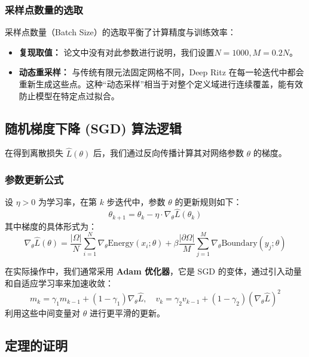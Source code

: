 	\subsubsection{采样点数量的选取}
	采样点数量（Batch Size）的选取平衡了计算精度与训练效率：
	\begin{itemize}
		\item \textbf{复现取值：} 论文中没有对此参数进行说明，我们设置$N = 1000, M = 0.2N$。
		\item \textbf{动态重采样：} 与传统有限元法固定网格不同，Deep Ritz 在每一轮迭代中都会重新生成这些点。这种“动态采样”相当于对整个定义域进行连续覆盖，能有效防止模型在特定点过拟合。
	\end{itemize}
	
	\subsection{随机梯度下降 (SGD) 算法逻辑}
	
	在得到离散损失 $\hat{L}(\theta)$ 后，我们通过反向传播计算其对网络参数 $\theta$ 的梯度。
	
	\subsubsection{参数更新公式}
	设 $\eta > 0$ 为学习率，在第 $k$ 步迭代中，参数 $\theta$ 的更新规则如下：
	\begin{equation}
		\theta_{k+1} = \theta_{k} - \eta \cdot \nabla_\theta \hat{L}(\theta_k)
	\end{equation}
	其中梯度的具体形式为：
	\begin{equation}
		\nabla_\theta \hat{L}(\theta) = \frac{|\Omega|}{N} \sum_{i=1}^N \nabla_\theta \text{Energy}(x_i; \theta) + \beta \frac{|\partial\Omega|}{M} \sum_{j=1}^M \nabla_\theta \text{Boundary}(y_j; \theta)
	\end{equation}
	
	在实际操作中，我们通常采用 \textbf{Adam 优化器}，它是 SGD 的变体，通过引入动量和自适应学习率来加速收敛：
	\begin{equation}
		m_k = \gamma_1 m_{k-1} + (1-\gamma_1) \nabla_\theta \hat{L}, \quad v_k = \gamma_2 v_{k-1} + (1-\gamma_2) (\nabla_\theta \hat{L})^2
	\end{equation}
	利用这些中间变量对 $\theta$ 进行更平滑的更新。

	\subsection{定理的证明}
	
